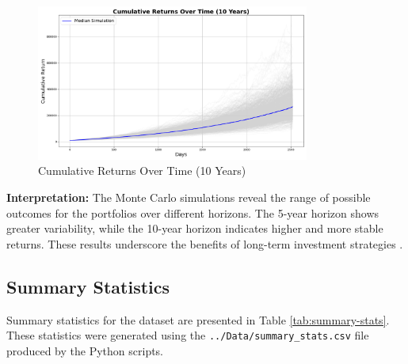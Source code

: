 \begin{figure}[!htbp]
    \centering
    \includegraphics[width=0.8\textwidth]{../Figures/cumulative_returns_over_time_10_years.png}
    \caption{Cumulative Returns Over Time (10 Years)}
    \label{fig:cumulative_returns_10y}
\end{figure}

\textbf{Interpretation:} The Monte Carlo simulations reveal the range of possible outcomes for the portfolios over different horizons. The 5-year horizon shows greater variability, while the 10-year horizon indicates higher and more stable returns. These results underscore the benefits of long-term investment strategies \citep{glasserman2004monte}.

\subsection{Summary Statistics}
Summary statistics for the dataset are presented in Table \ref{tab:summary-stats}. These statistics were generated using the \texttt{../Data/summary\_stats.csv} file produced by the Python scripts.

